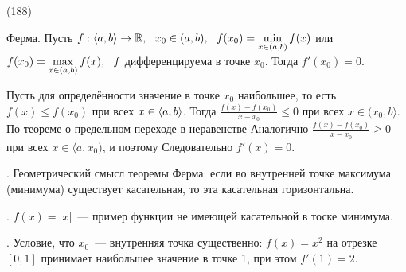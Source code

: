 (188)

\T \q Ферма. Пусть $f: \langle a, b \rangle \to \mathbb{R},\ \  x_0 \in (a, b),\ \  f(x_0) = \displaystyle \min\limits^{}_{x \in (a, b)} f(x)$ или $f(x_0) = \displaystyle \max\limits^{}_{x \in (a, b)} f(x),\ \  f$ дифференцируема в точке $x_0$. Тогда $f'(x_0) = 0$.

\D Пусть для определённости значение в точке $x_0$ наибольшее, то есть $f(x) \le f(x_0)$ при всех $x \in \langle a, b \rangle$. Тогда $\frac{f(x) - f(x_0)}{x - x_0} \le 0$ при всех $x \in (x_0, b\rangle$. По теореме о предельном переходе в неравенстве   Аналогично $\frac{f(x) - f(x_0)}{x - x_0} \ge 0$ при всех $x \in \langle a, x_0)$, и поэтому  Следовательно $f'(x) = 0$.

. Геометрический смысл теоремы Ферма: если во внутренней точке максимума (минимума) существует касательная, то эта касательная горизонтальна.

. $f(x) = |x|$~--- пример функции не имеющей касательной в тоске минимума.

. Условие, что $x_0$~--- внутренняя точка существенно: $f(x) = x^2$ на отрезке $[0, 1]$ принимает наибольшее значение в точке 1, при этом $f'(1) = 2$.